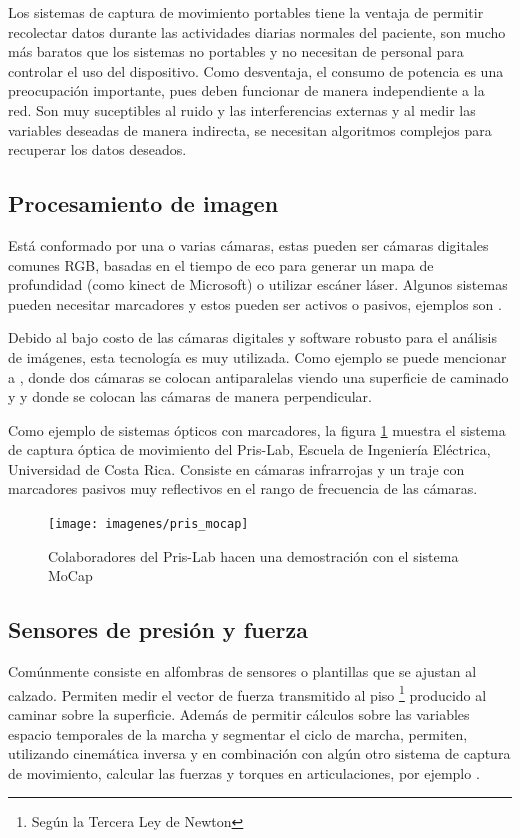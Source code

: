 Los sistemas de captura de movimiento portables tiene la ventaja de permitir recolectar datos durante las actividades diarias normales del paciente, son mucho más baratos que los sistemas no portables y no necesitan de personal para controlar el uso del dispositivo. Como desventaja, el consumo de potencia es una preocupación importante, pues deben funcionar de manera independiente a la red. Son muy suceptibles al ruido y las interferencias externas y al medir las variables deseadas de manera indirecta, se necesitan algoritmos complejos para recuperar los datos deseados. \citep{muro}

\subsection{Procesamiento de imagen}

Está conformado por una o varias cámaras, estas pueden ser cámaras digitales comunes RGB, basadas en el tiempo de eco para generar un mapa de profundidad (como kinect de Microsoft) o utilizar escáner láser. Algunos sistemas pueden necesitar marcadores y estos pueden ser activos o pasivos, ejemplos son \cite{prakash, yang2}. \citep{muro}

Debido al bajo costo de las cámaras digitales y software robusto para el análisis de imágenes, esta tecnología es muy utilizada. Como ejemplo se puede mencionar a \cite{hoang}, donde dos cámaras se colocan antiparalelas viendo una superficie de caminado y \cite{li} y \cite{mrozowski} donde se colocan las cámaras de manera perpendicular. 

Como ejemplo de sistemas ópticos con marcadores, la figura \ref{fig:pris_mocap} muestra el sistema de captura óptica de movimiento  del Pris-Lab, Escuela de Ingeniería Eléctrica, Universidad de Costa Rica. Consiste en cámaras infrarrojas y un traje con marcadores pasivos muy reflectivos en el rango de frecuencia de las cámaras. 

\begin{figure}
    \centering
    \texttt{[image: imagenes/pris\_mocap]}
    \caption{Colaboradores del Pris-Lab hacen una demostración con el sistema MoCap}
    \label{fig:pris_mocap}
\end{figure}

\subsection{Sensores de presión y fuerza}

Comúnmente consiste en alfombras de sensores o plantillas que se ajustan al calzado. Permiten medir el vector de fuerza transmitido al piso \footnote{Según la Tercera Ley de Newton} producido al caminar sobre la superficie. Además de permitir cálculos sobre las variables espacio temporales de la marcha y segmentar el ciclo de marcha, permiten, utilizando cinemática inversa y en combinación con algún otro sistema de captura de movimiento, calcular las fuerzas y torques en articulaciones, por ejemplo \cite{mizoguchi}.


